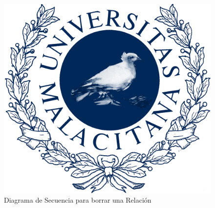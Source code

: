 \newpage %

\begin{figure}[H]
    \includegraphics[width=1\linewidth]{assets/umaLogo.png}
    \caption{Diagrama de Secuencia para borrar una Relación}
   \end{figure}
\vspace{1.0cm}

\newpage %